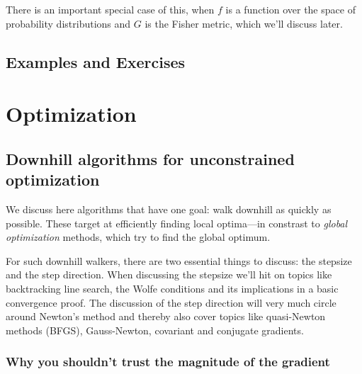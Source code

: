 There is an important special case of this, when $f$ is a function over the space of probability distributions and $G$ is the Fisher metric, which we'll discuss later.


\subsection{Examples and Exercises}














\section{Optimization}

\subsection{Downhill algorithms for unconstrained optimization}

We discuss here algorithms that have one goal: walk downhill as
quickly as possible. These target at efficiently finding local
optima---in constrast to \emph{global optimization} methods, which try
to find the global optimum.

For such downhill walkers, there are two essential things to discuss:
the stepsize and the step direction. When discussing the stepsize
we'll hit on topics like backtracking line search, the Wolfe
conditions and its implications in a basic convergence
proof. The discussion of the step direction will very much circle around
Newton's method and thereby also cover topics like quasi-Newton
methods (BFGS), Gauss-Newton, covariant and conjugate gradients.

\subsubsection{Why you shouldn't trust the magnitude of the gradient}

